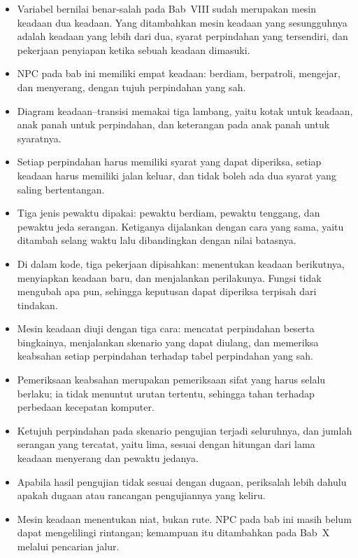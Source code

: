 
\begin{rangkumanbox}
\begin{itemize}
  \item Variabel bernilai benar-salah pada Bab~VIII sudah merupakan mesin
        keadaan dua keadaan. Yang ditambahkan mesin keadaan yang sesungguhnya
        adalah keadaan yang lebih dari dua, syarat perpindahan yang tersendiri,
        dan pekerjaan penyiapan ketika sebuah keadaan dimasuki.
  \item NPC pada bab ini memiliki empat keadaan: berdiam, berpatroli, mengejar,
        dan menyerang, dengan tujuh perpindahan yang sah.
  \item Diagram keadaan--transisi memakai tiga lambang, yaitu kotak untuk
        keadaan, anak panah untuk perpindahan, dan keterangan pada anak panah
        untuk syaratnya.
  \item Setiap perpindahan harus memiliki syarat yang dapat diperiksa, setiap
        keadaan harus memiliki jalan keluar, dan tidak boleh ada dua syarat
        yang saling bertentangan.
  \item Tiga jenis pewaktu dipakai: pewaktu berdiam, pewaktu tenggang, dan
        pewaktu jeda serangan. Ketiganya dijalankan dengan cara yang sama, yaitu
        ditambah selang waktu lalu dibandingkan dengan nilai batasnya.
  \item Di dalam kode, tiga pekerjaan dipisahkan:  menentukan
        keadaan berikutnya,  menyiapkan keadaan baru, dan
         menjalankan perilakunya. Fungsi  tidak mengubah
        apa pun, sehingga keputusan dapat diperiksa terpisah dari tindakan.
  \item Mesin keadaan diuji dengan tiga cara: mencatat perpindahan beserta
        bingkainya, menjalankan skenario yang dapat diulang, dan memeriksa
        keabsahan setiap perpindahan terhadap tabel perpindahan yang sah.
  \item Pemeriksaan keabsahan merupakan pemeriksaan sifat yang harus selalu
        berlaku; ia tidak menuntut urutan tertentu, sehingga tahan terhadap
        perbedaan kecepatan komputer.
  \item Ketujuh perpindahan pada skenario pengujian terjadi seluruhnya, dan
        jumlah serangan yang tercatat, yaitu lima, sesuai dengan hitungan dari
        lama keadaan menyerang dan pewaktu jedanya.
  \item Apabila hasil pengujian tidak sesuai dengan dugaan, periksalah lebih
        dahulu apakah dugaan atau rancangan pengujiannya yang keliru.
  \item Mesin keadaan menentukan niat, bukan rute. NPC pada bab ini masih belum
        dapat mengelilingi rintangan; kemampuan itu ditambahkan pada Bab~X
        melalui pencarian jalur.
\end{itemize}
\end{rangkumanbox}
